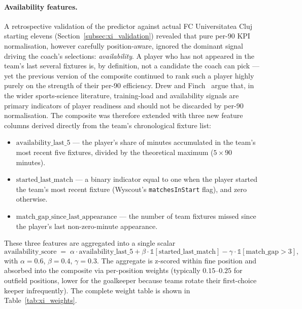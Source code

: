 \paragraph{Availability features.}
A retrospective validation of the predictor against actual FC Universitatea Cluj starting elevens (Section~\ref{subsec:xi_validation}) revealed that pure per-90 KPI normalisation, however carefully position-aware, ignored the dominant signal driving the coach's selections: \emph{availability}. A player who has not appeared in the team's last several fixtures is, by definition, not a candidate the coach can pick --- yet the previous version of the composite continued to rank such a player highly purely on the strength of their per-90 efficiency. Drew and Finch~\cite{drew2016training} argue that, in the wider sports-science literature, training-load and availability signals are primary indicators of player readiness and should not be discarded by per-90 normalisation. The composite was therefore extended with three new feature columns derived directly from the team's chronological fixture list:
\begin{itemize}
    \item $\text{availability\_last\_5}$ --- the player's share of minutes accumulated in the team's most recent five fixtures, divided by the theoretical maximum ($5 \times 90$ minutes).
    \item $\text{started\_last\_match}$ --- a binary indicator equal to one when the player started the team's most recent fixture (Wyscout's \texttt{matchesInStart} flag), and zero otherwise.
    \item $\text{match\_gap\_since\_last\_appearance}$ --- the number of team fixtures missed since the player's last non-zero-minute appearance.
\end{itemize}
These three features are aggregated into a single scalar
\begin{equation}
    \text{availability\_score} \;=\;
    \alpha \cdot \text{availability\_last\_5}
    + \beta \cdot \mathbb{1}[\text{started\_last\_match}]
    - \gamma \cdot \mathbb{1}[\text{match\_gap} > 3],
\end{equation}
with $\alpha = 0.6$, $\beta = 0.4$, $\gamma = 0.3$. The aggregate is z-scored within fine position and absorbed into the composite via per-position weights (typically $0.15$--$0.25$ for outfield positions, lower for the goalkeeper because teams rotate their first-choice keeper infrequently). The complete weight table is shown in Table~\ref{tab:xi_weights}.

